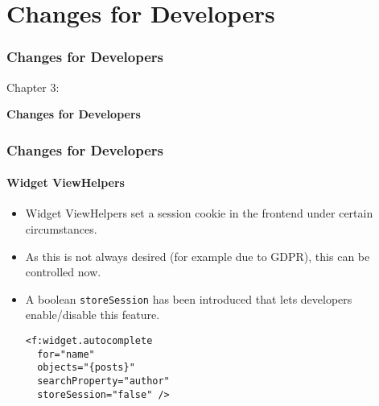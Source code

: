 %

\section{Changes for Developers}
\begin{frame}[fragile]
	\frametitle{Changes for Developers}

	\begin{center}\huge{Chapter 3:}\end{center}
	\begin{center}\huge{\color{typo3darkgrey}\textbf{Changes for Developers}}\end{center}

\end{frame}


\begin{frame}[fragile]
	\frametitle{Changes for Developers}
	\framesubtitle{Widget ViewHelpers}

	\lstset{basicstyle=\smaller\ttfamily}

	\begin{itemize}
		\item Widget ViewHelpers set a session cookie in the frontend under certain circumstances.
		\item As this is not always desired (for example due to GDPR), this can be controlled now.
		\item A boolean \texttt{storeSession} has been introduced that lets developers enable/disable this feature.
\begin{lstlisting}
<f:widget.autocomplete
  for="name"
  objects="{posts}"
  searchProperty="author"
  storeSession="false" />
\end{lstlisting}

	\end{itemize}

\end{frame}


